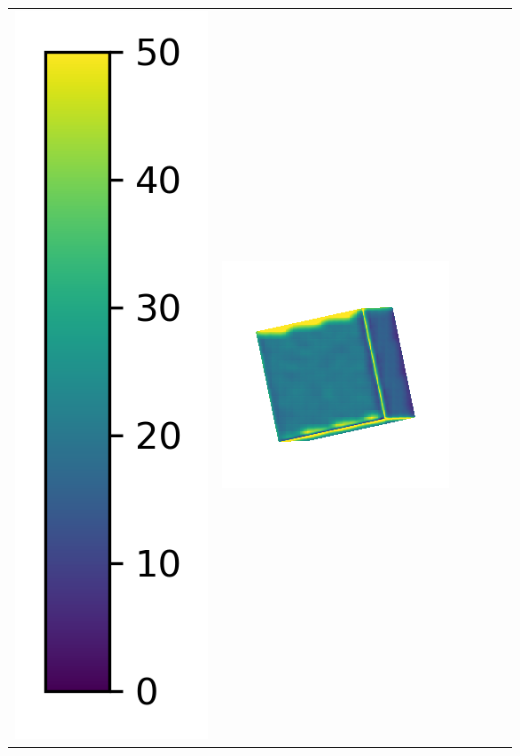 \begin{center}
\begin{tabularx}{\linewidth}{@{}Y@{}Y@{}Y@{}Y@{}Y@{}Y@{}}
\includegraphics[width=0.2\linewidth]{semisynthetic/colorbar_error_vertical.png} &
\includegraphics[width=\linewidth]{semisynthetic/20150514_0_ours_err.png} &

\end{tabularx}
\end{center}
